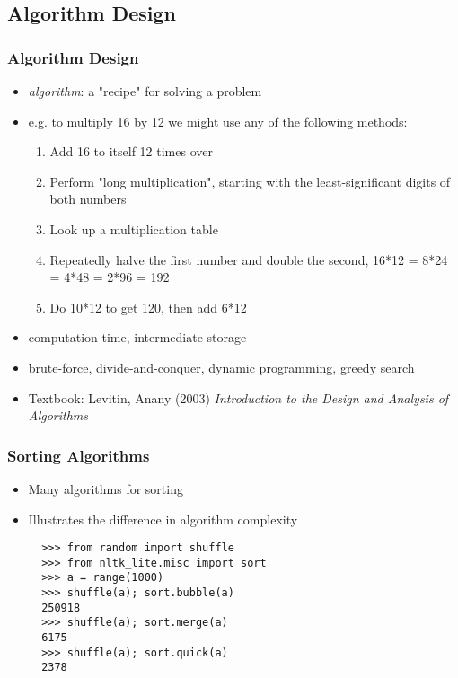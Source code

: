 \documentclass[handout]{beamer}
\begin{document}
\subsection{Algorithm Design}

\begin{frame}
  \frametitle{Algorithm Design}
  \small

  \begin{itemize}
  \item \textit{algorithm}: a "recipe" for solving a problem
  \item e.g. to multiply 16 by 12 we might use any of the following methods:

    \begin{enumerate}
    \item Add 16 to itself 12 times over
    \item Perform "long multiplication", starting with the least-significant
      digits of both numbers
    \item Look up a multiplication table
    \item Repeatedly halve the first number and double the second,
      16*12 = 8*24 = 4*48 = 2*96 = 192
    \item Do 10*12 to get 120, then add 6*12
    \end{enumerate}

  \item computation time, intermediate storage
  \item brute-force, divide-and-conquer, dynamic programming, greedy search
  \item Textbook: Levitin, Anany (2003) \textit{Introduction to the Design and
      Analysis of Algorithms}
  \end{itemize}
\end{frame}

\begin{frame}[fragile]
\frametitle{Sorting Algorithms}

\begin{itemize}
\item Many algorithms for sorting
\item Illustrates the difference in algorithm complexity

\begin{verbatim}
  >>> from random import shuffle
  >>> from nltk_lite.misc import sort
  >>> a = range(1000)
  >>> shuffle(a); sort.bubble(a)
  250918
  >>> shuffle(a); sort.merge(a)
  6175
  >>> shuffle(a); sort.quick(a)
  2378
\end{verbatim}
\end{itemize}
\end{frame}
\end{document}
